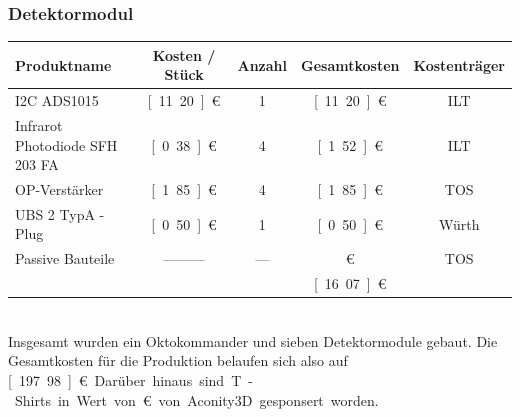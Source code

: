 \subsubsection*{Detektormodul} 
\begin{tabularx}{\textwidth}{p{4.5cm} | c c c c}
	Produktname 			& Kosten / Stück	& Anzahl & Gesamtkosten    	& Kostenträger \\ 
	\hline
	I2C ADS1015				& \unit[11.20]{€}   &   1    & \unit[11.20]{€}	& ILT    \\ [2mm]
	Infrarot Photodiode SFH 203 FA&	\unit[0.38]{€}	&   4    & \unit[1.52]{€} 	& ILT	 \\ [8mm]
	OP-Verstärker    		& \unit[1.85]{€}    &	4    & \unit[1.85]{€}  	& TOS    \\ [2mm]
	UBS 2 TypA -Plug		& \unit[0.50]{€}    &   1    & \unit[0.50]{€} 	& Würth  \\ [2mm]
	Passive Bauteile    	&	---------       &  ---	 & \unit[1]{€}	   	& TOS    \\ [2mm]
	\hline
							&					&		 & \unit[16.07]{€}		&		
\end{tabularx} \\

\noindent
Insgesamt wurden ein Oktokommander und sieben Detektormodule gebaut. Die Gesamtkosten für die Produktion belaufen sich also auf \unit[197.98]{€}. Darüber hinaus sind T-Shirts in Wert von \unit[200]{€} von Aconity3D gesponsert worden.